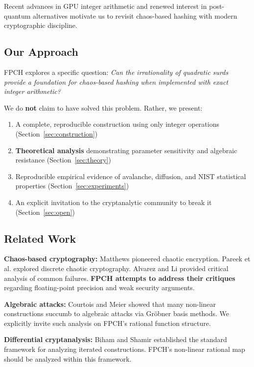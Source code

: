 \documentclass[11pt,a4paper]{article}
\theoremstyle{plain}
\theoremstyle{definition}
\theoremstyle{remark}
\begin{document}
Recent advances in GPU integer arithmetic and renewed interest in post-quantum alternatives motivate us to revisit chaos-based hashing with modern cryptographic discipline.

\subsection{Our Approach}

FPCH explores a specific question: \textit{Can the irrationality of quadratic surds provide a foundation for chaos-based hashing when implemented with exact integer arithmetic?}

We do \textbf{not} claim to have solved this problem. Rather, we present:
\begin{enumerate}
    \item A complete, reproducible construction using only integer operations (Section~\ref{sec:construction})
    \item \textbf{Theoretical analysis} demonstrating parameter sensitivity and algebraic resistance (Section~\ref{sec:theory})
    \item Reproducible empirical evidence of avalanche, diffusion, and NIST statistical properties (Section~\ref{sec:experiments})
    \item An explicit invitation to the cryptanalytic community to break it (Section~\ref{sec:open})
\end{enumerate}

\subsection{Related Work}

\textbf{Chaos-based cryptography:} Matthews \cite{matthews1989} pioneered chaotic encryption. Pareek et al. \cite{pareek2003} explored discrete chaotic cryptography. Alvarez and Li \cite{alvarez2006} provided critical analysis of common failures. \textbf{FPCH attempts to address their critiques} regarding floating-point precision and weak security arguments.

\textbf{Algebraic attacks:} Courtois and Meier \cite{courtois2003} showed that many non-linear constructions succumb to algebraic attacks via Gr\"obner basis methods. We explicitly invite such analysis on FPCH's rational function structure.

\textbf{Differential cryptanalysis:} Biham and Shamir \cite{biham1991} established the standard framework for analyzing iterated constructions. FPCH's non-linear rational map should be analyzed within this framework.
\end{document}
